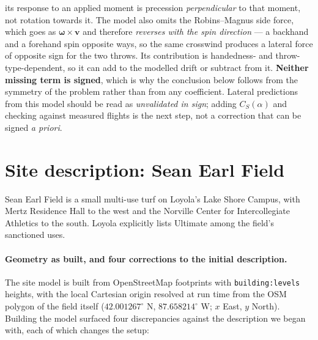 \documentclass[11pt,letterpaper]{article}
\begin{document}
its response to an applied moment is precession \emph{perpendicular} to that moment, not
rotation towards it. The model also omits the Robins--Magnus side
force, which goes as $\boldsymbol{\omega} \times \mathbf{v}$ and therefore \emph{reverses
with the spin direction} --- a backhand and a forehand spin opposite ways, so the same
crosswind produces a lateral force of opposite sign for the two throws. Its contribution
is handedness- and throw-type-dependent, so it can add to the modelled drift or subtract
from it. \textbf{Neither missing term is signed}, which is why the conclusion below
follows from the symmetry of the problem rather than from any coefficient. Lateral predictions from this model should be read as \emph{unvalidated in sign};
adding $C_S(\alpha)$ and checking against measured flights is the next step, not a
correction that can be signed \emph{a priori}.

\section{Site description: Sean Earl Field}

Sean Earl Field is a small multi-use turf on Loyola's Lake Shore Campus, with
Mertz Residence Hall to the west and the Norville Center for Intercollegiate
Athletics to the south. Loyola explicitly lists Ultimate among the field's
sanctioned uses.

\paragraph{Geometry as built, and four corrections to the initial description.}
The site model is built from OpenStreetMap footprints with
\texttt{building:levels} heights, with the local Cartesian origin resolved at
run time from the OSM polygon of the field itself
($42.001267^\circ$ N, $87.658214^\circ$ W; $x$ East, $y$ North). Building the
model surfaced four discrepancies against the description we began with, each
of which changes the setup:
\end{document}
